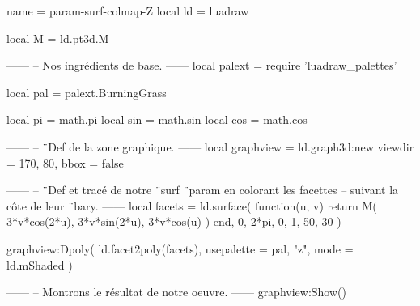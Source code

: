 \documentclass[border = 3pt]{standalone}
\begin{document}
\begin{luadraw*}{name = param-surf-colmap-Z}
local ld = luadraw

local M = ld.pt3d.M

------
-- Nos ingrédients de base.
------
local palext = require 'luadraw_palettes'

local pal = palext.BurningGrass

local pi  = math.pi
local sin = math.sin
local cos = math.cos

------
-- ¨Def de la zone graphique.
------
local graphview = ld.graph3d:new{
  viewdir = {170, 80},
  bbox    = false
}

------
-- ¨Def et tracé de notre ¨surf ¨param en colorant les facettes
-- suivant la côte de leur ¨bary.
------
local facets = ld.surface(
  function(u, v)
    return M(
      3*v*cos(2*u),
      3*v*sin(2*u),
      3*v*cos(u)
    )
  end,
  0, 2*pi, 0, 1,
  {50, 30}
)

graphview:Dpoly(
  ld.facet2poly(facets),
  {
    usepalette = {pal, "z"},
    mode       = ld.mShaded
  }
)

------
-- Montrons le résultat de notre oeuvre.
------
graphview:Show()
\end{luadraw*}
\end{document}
